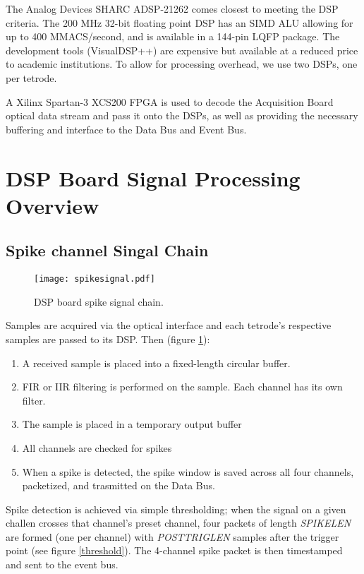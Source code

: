  The Analog Devices SHARC ADSP-21262 comes closest to meeting
the DSP criteria. The 200 MHz 32-bit floating point DSP has an SIMD
ALU allowing for up to 400 MMACS/second, and is available in a 144-pin
LQFP package. The development tools (VisualDSP++) are expensive but
available at a reduced price to academic institutions. To allow for
processing overhead, we use two DSPs, one per tetrode.  
      
A Xilinx Spartan-3 XCS200 FPGA is used to decode the Acquisition Board
optical data stream and pass it onto the DSPs, as well as providing
the necessary buffering and interface to the Data Bus and Event Bus.

\section{DSP Board Signal Processing Overview}

\subsection{Spike channel Singal Chain}
\begin{figure}[h!]
\begin{center}
\texttt{[image: spikesignal.pdf]}
\end{center}
\label{SpikeChain}
\caption{DSP board spike signal chain.}
\end{figure}

Samples are acquired via the optical interface and each tetrode's respective samples are passed to its DSP. Then (figure \ref{SpikeChain}): 

\begin{enumerate}
\item A received sample is placed into a fixed-length circular buffer. 
\item FIR or IIR filtering is performed on the sample. Each channel has its own filter. 
\item The sample is placed in a temporary output buffer
\item All channels are checked for spikes
\item When a spike is detected, the spike window is saved across all four channels, packetized, and trasmitted on the Data Bus. 
\end{enumerate}


Spike detection is achieved via simple thresholding; when the signal on a given challen crosses that channel's preset channel, four packets of length \textit{SPIKELEN} are formed (one per channel) with \textit{POSTTRIGLEN} samples after the trigger point (see figure \ref{threshold}). The 4-channel spike packet is then timestamped and sent to the event bus. 

